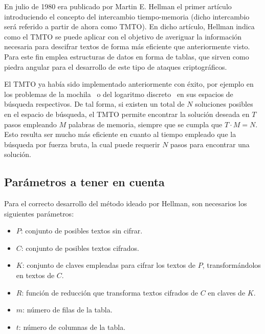 \documentclass[12pt,spanish,listoffigures,listoftables,listofalgorithms]{tfgetsinf}
\begin{document}
En julio de 1980 era publicado por Martin E. Hellman el primer artículo introduciendo el concepto del intercambio tiempo-memoria \cite{hellman}(dicho intercambio será referido a partir de ahora como TMTO). En dicho artículo, Hellman indica como el TMTO se puede aplicar con el objetivo de averiguar la información necesaria para descifrar textos de forma más eficiente que anteriormente visto. Para este fin emplea estructuras de datos en forma de tablas, que sirven como piedra angular para el desarrollo de este tipo de ataques criptográficos.

El TMTO ya había sido implementado anteriormente con éxito, por ejemplo en los problemas de la mochila~\cite{knapsack} o del logaritmo discreto~\cite{logarithm} en sus espacios de búsqueda respectivos. De tal forma, si existen un total de $N$ soluciones posibles en el espacio de búsqueda, el TMTO permite encontrar la solución deseada en $T$ pasos empleando $M$ palabras de memoria, siempre que se cumpla que $T \cdot M = N$. Esto resulta ser mucho más eficiente en cuanto al tiempo empleado que la búsqueda por fuerza bruta, la cual puede requerir $N$ pasos para encontrar una solución.

\subsection{Parámetros a tener en cuenta}\label{params}

Para el correcto desarrollo del método ideado por Hellman, son necesarios  los siguientes parámetros:

\begin{itemize}

    \item $P$: conjunto de posibles textos sin cifrar.
    
    \item $C$: conjunto de posibles textos cifrados.
    
    \item $K$: conjunto de claves empleadas para cifrar los textos de $P$, transformándolos en textos de $C$.
    
    \item $R$: función de reducción que transforma textos cifrados de $C$ en claves de $K$.
    
    \item $m$: número de filas de la tabla.
    
    \item $t$: número de columnas de la tabla.

\end{itemize}
\end{document}
